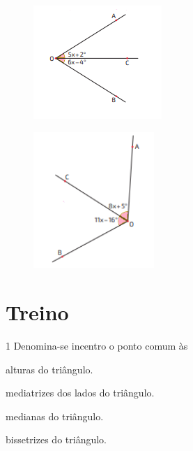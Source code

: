 \begin{escolha}
\item
\begin{figure}[H]
\centering\includegraphics[width=1.91667in,height=1.6875in]{./imgSAEB_8_MAT/media/image33.png}
\end{figure}




\item
\begin{figure}[H]
\centering\includegraphics[width=1.80208in,height=2.02917in]{./imgSAEB_8_MAT/media/image34.png}
\end{figure}



\end{escolha}

\section*{Treino}

\num{1} Denomina-se incentro o ponto comum às

\begin{escolha}[itemsep=0pt]
\item alturas do triângulo.
\item mediatrizes dos lados do triângulo.
\item medianas do triângulo.
\item bissetrizes do triângulo. 
\end{escolha}


